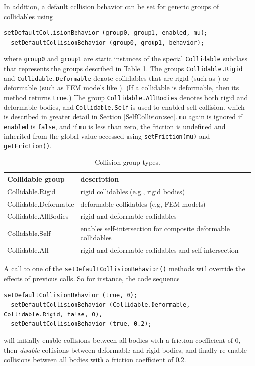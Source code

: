 In addition, a default collision
behavior can be set for generic groups of collidables using
%
\begin{lstlisting}[]
  setDefaultCollisionBehavior (group0, group1, enabled, mu);
  setDefaultCollisionBehavior (group0, group1, behavior);
\end{lstlisting}
%
where {\tt group0} and {\tt group1} are static instances of the
special {\tt Collidable} subclass
 that
represents the groups described in Table \ref{CollisionGroups:tab}.
The groups {\tt Collidable.Rigid} and {\tt Collidable.Deformable}
denote collidables that are rigid (such as
) or deformable (such
as FEM models like ).
(If a collidable is deformable, then its
method returns {\tt true}.)  The group {\tt Collidable.AllBodies}
denotes both rigid and deformable bodies, and {\tt Collidable.Self} is
used to enabled self-collision. which is described in greater detail
in Section \ref{SelfCollision:sec}.
{\tt mu} again is ignored if {\tt enabled} is {\tt false},
and if {\tt mu} is less than zero, the friction is undefined
and inherited from the global value accessed using 
{\tt setFriction(mu)} and {\tt getFriction()}.

\begin{table}[h]
\begin{center}
\begin{tabular}{|ll|}
\hline
Collidable group & description \\
\hline
Collidable.Rigid & rigid collidables (e.g., rigid bodies) \\
Collidable.Deformable & deformable collidables (e.g, FEM models) \\
Collidable.AllBodies & rigid and deformable collidables \\
Collidable.Self & enables self-intersection
for composite deformable collidables\\
Collidable.All & rigid and deformable collidables and self-intersection\\
\hline
\end{tabular}
\end{center}
\caption{Collision group types.}
\label{CollisionGroups:tab}
\end{table}

A call to one of the {\tt setDefaultCollisionBehavior()} methods will
override the effects of previous calls. So for instance, the code
sequence
%
\begin{lstlisting}[]
  setDefaultCollisionBehavior (true, 0);
  setDefaultCollisionBehavior (Collidable.Deformable, Collidable.Rigid, false, 0);
  setDefaultCollisionBehavior (true, 0.2);
\end{lstlisting}
%
will initially enable collisions between all bodies with a friction
coefficient of 0, then {\it disable} collisions between deformable and
rigid bodies, and finally re-enable collisions between all bodies with
a friction coefficient of 0.2.

